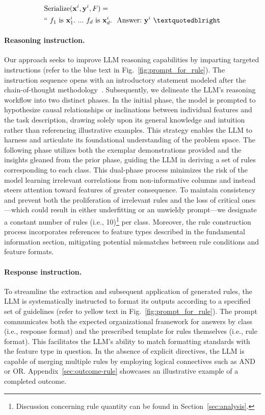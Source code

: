 \begin{align}
&\text{Serialize}(\mathbf{x}^i,\mathbf{y}^i, F) = \nonumber \\ 
&``\ f_1\ \text{is}\ \mathbf{x}^i_1.\ ... \ f_d\  \text{is}\  \mathbf{x}^i_d.\ \ \text{Answer:}\  \mathbf{y}^i\ ”
\end{align}

\vspace*{-0.12in}
\paragraph{Reasoning instruction.} Our approach seeks to improve LLM reasoning capabilities by imparting targeted instructions (refer to the blue text in Fig.~\ref{fig:prompt_for_rule}). The instruction sequence opens with an introductory statement modeled after the chain-of-thought methodology~\cite{wei2022chain}. Subsequently, we delineate the LLM's reasoning workflow into two distinct phases. In the initial phase, the model is prompted to hypothesize causal relationships or inclinations between individual features and the task description, drawing solely upon its general knowledge and intuition rather than referencing illustrative examples. This strategy enables the LLM to harness and articulate its foundational understanding of the problem space. The following phase utilizes both the exemplar demonstrations provided and the insights gleaned from the prior phase, guiding the LLM in deriving a set of rules corresponding to each class. This dual-phase process minimizes the risk of the model learning irrelevant correlations from non-informative columns and instead steers attention toward features of greater consequence. To maintain consistency and prevent both the proliferation of irrelevant rules and the loss of critical ones—which could result in either underfitting or an unwieldy prompt—we designate a constant number of rules (i.e., 10)\footnote{Discussion concerning rule quantity can be found in Section~\ref{sec:analysis}.} per class. Moreover, the rule construction process incorporates references to feature types described in the fundamental information section, mitigating potential mismatches between rule conditions and feature formats.

\vspace*{-0.12in}
\paragraph{Response instruction.} To streamline the extraction and subsequent application of generated rules, the LLM is systematically instructed to format its outputs according to a specified set of guidelines (refer to yellow text in Fig.~\ref{fig:prompt_for_rule}). The prompt communicates both the expected organizational framework for answers by class (i.e., response format) and the prescribed template for rules themselves (i.e., rule format). This facilitates the LLM's ability to match formatting standards with the feature type in question. In the absence of explicit directives, the LLM is capable of merging multiple rules by employing logical connectives such as AND or OR. Appendix~\ref{sec:outcome-rule} showcases an illustrative example of a completed outcome.


